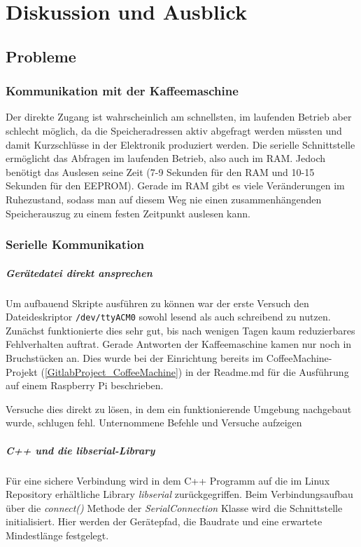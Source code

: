\chapter{Diskussion und Ausblick}

\section{Probleme}

\subsection{Kommunikation mit der Kaffeemaschine} \label{subsec:zugangSeriellDirekt}
Der direkte Zugang ist wahrscheinlich am schnellsten, im laufenden Betrieb aber schlecht möglich, da die Speicheradressen aktiv abgefragt werden müssten und damit Kurzschlüsse in der Elektronik produziert werden. Die serielle Schnittstelle ermöglicht das Abfragen im laufenden Betrieb, also auch im \ac{RAM}. Jedoch benötigt das Auslesen seine Zeit (7-9 Sekunden für den \ac{RAM} und 10-15 Sekunden für den \ac{EEPROM}). Gerade im \ac{RAM} gibt es viele Veränderungen im Ruhezustand, sodass man auf diesem Weg nie einen zusammenhängenden Speicherauszug zu einem festen Zeitpunkt auslesen kann.

\subsection{Serielle Kommunikation} \label{subsec:kommunikationGeraetedateiLibserialLibrary}
\paragraph{Gerätedatei direkt ansprechen}
Um aufbauend Skripte ausführen zu können war der erste Versuch den Dateideskriptor \texttt{/dev/ttyACM0} sowohl lesend als auch schreibend zu nutzen. Zunächst funktionierte dies sehr gut, bis nach wenigen Tagen kaum reduzierbares Fehlverhalten auftrat. Gerade Antworten der Kaffeemaschine kamen nur noch in Bruchstücken an. Dies wurde bei der Einrichtung bereits im CoffeeMachine-Projekt (\ref{GitlabProject_CoffeeMachine}) in der Readme.md für die Ausführung auf einem Raspberry Pi beschrieben.

Versuche dies direkt zu lösen, in dem ein funktionierende Umgebung nachgebaut wurde, schlugen fehl.
\todo Unternommene Befehle und Versuche aufzeigen

\paragraph{C++ und die \textit{libserial}-Library}
Für eine sichere Verbindung wird in dem C++ Programm auf die im Linux Repository erhältliche Library \textit{libserial} zurückgegriffen. Beim Verbindungsaufbau über die \textit{connect()} Methode der \textit{SerialConnection} Klasse wird die Schnittstelle initialisiert. Hier werden der Gerätepfad, die Baudrate und eine erwartete Mindestlänge festgelegt.

